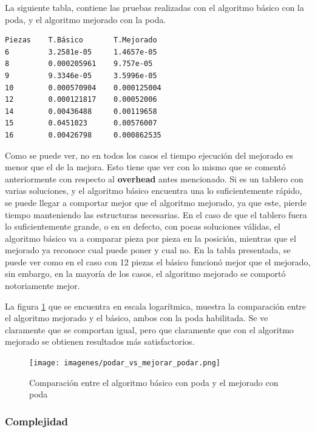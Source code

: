 \documentclass[11pt,a4paper]{article}
\begin{document}
La siguiente tabla, contiene las pruebas realizadas con el algoritmo básico con la poda, y el algoritmo mejorado con la poda.

\begin{center}
\begin{Verbatim}[commandchars=\\\{\}]
Piezas    T.Básico       T.Mejorado
6         3.2581e-05     1.4657e-05
8         0.000205961    9.757e-05
9         9.3346e-05     3.5996e-05
10        0.000570904    0.000125004
12        0.000121817    0.00052006
14        0.00436488     0.00119658
15        0.0451023      0.00576007
16        0.00426798     0.000862535
\end{Verbatim}
\end{center}

Como se puede ver, no en todos los casos el tiempo ejecución del mejorado es menor que el de la mejora. Esto tiene que ver con lo mismo que se comentó anteriormente con respecto al \textbf{overhead} antes mencionado. Si es un tablero con varias soluciones, y el algoritmo básico encuentra una lo suficientemente rápido, se puede llegar a comportar mejor que el algoritmo mejorado, ya que este, pierde tiempo manteniendo las estructuras necesarias. En el caso de que el tablero fuera lo suficientemente grande, o en su defecto, con pocas soluciones válidas, el algoritmo básico va a comparar pieza por pieza en la posición, mientras que el mejorado ya reconoce cual puede poner y cual no. En la tabla presentada, se puede ver como en el caso con 12 piezas el básico funcionó mejor que el mejorado, sin embargo, en la mayoría de los casos, el algoritmo mejorado se comportó notoriamente mejor.

La figura \ref{fig:podar_vs_mejorar_podar} que se encuentra en escala logarítmica, muestra la comparación entre el algoritmo mejorado y el básico, ambos con la poda habilitada. Se ve claramente que se comportan igual, pero que claramente que con el algoritmo mejorado se obtienen resultados más satisfactorios.

	\begin{figure}[H]
    	\begin{center}
        	\texttt{[image: imagenes/podar\_vs\_mejorar\_podar.png]}
    	\end{center}
    	\caption{Comparación entre el algoritmo básico con poda y el mejorado con poda}
    	\label{fig:podar_vs_mejorar_podar}
	\end{figure}


\subsubsection*{Complejidad}
\end{document}
